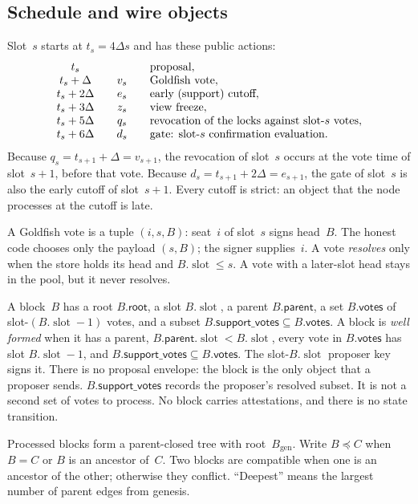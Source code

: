 \documentclass{article}
\theoremstyle{plain}
\theoremstyle{definition}
\theoremstyle{remark}
\newcommand{\genesis}{B_{\mathrm{gen}}}
\newcommand{\slot}{\operatorname{slot}}
\newcommand{\parent}{\mathsf{parent}}
\newcommand{\rootf}{\mathsf{root}}
\newcommand{\votesf}{\mathsf{votes}}
\newcommand{\supportf}{\mathsf{support\_votes}}
\begin{document}
\subsection{Schedule and wire objects}\label{sec:schedule}

Slot~$s$ starts at $t_s=4\Delta s$ and has these public actions:
\[
\begin{array}{c@{\qquad}c@{\qquad}l}
 t_s        &      & \text{proposal},\\
 t_s+\Delta  & v_s & \text{Goldfish vote},\\
 t_s+2\Delta & e_s & \text{early (support) cutoff},\\
 t_s+3\Delta & z_s & \text{view freeze},\\
 t_s+5\Delta & q_s & \text{revocation of the locks against slot-$s$ votes},\\
 t_s+6\Delta & d_s & \text{gate: slot-$s$ confirmation evaluation}.
\end{array}
\]
Because $q_s=t_{s+1}+\Delta=v_{s+1}$, the revocation of slot~$s$ occurs at
the vote time of slot~$s+1$, before that vote.  Because
$d_s=t_{s+1}+2\Delta=e_{s+1}$, the gate of slot~$s$ is also the early
cutoff of slot~$s+1$.  Every cutoff is strict: an object that the node
processes at the cutoff is late.

A Goldfish vote is a tuple $(i,s,B)$: seat~$i$ of slot~$s$ signs
head~$B$.  The honest code chooses only the payload $(s,B)$; the signer
supplies~$i$.  A vote \emph{resolves} only when the store holds its head
and $B.\slot\leq s$.  A vote with a later-slot head stays in the pool,
but it never resolves.

A block~$B$ has a root $B.\rootf$, a slot $B.\slot$, a parent
$B.\parent$, a set $B.\votesf$ of slot-$(B.\slot-1)$ votes, and a
subset $B.\supportf\subseteq B.\votesf$.  A block is \emph{well formed}
when it has a parent, $B.\parent.\slot<B.\slot$, every vote in
$B.\votesf$ has slot $B.\slot-1$, and $B.\supportf\subseteq B.\votesf$.
The slot-$B.\slot$ proposer key signs it.  There is no proposal
envelope: the block is the only object that a proposer sends.
$B.\supportf$ records the proposer's resolved subset.  It is not a
second set of votes to process.  No block carries attestations, and
there is no state transition.

Processed blocks form a parent-closed tree with root~$\genesis$.  Write
$B\preceq C$ when $B=C$ or $B$ is an ancestor of~$C$.  Two blocks are
compatible when one is an ancestor of the other; otherwise they
conflict.  ``Deepest'' means the largest number of parent edges from
genesis.
\end{document}
